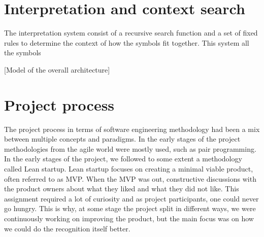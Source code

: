 

\section{Interpretation and context search} %



The interpretation system consist of a recursive search function and a set of fixed rules to determine the context of how the symbols fit together. This system all the symbols 

[Model of the overall architecture]





\section{Project process}
The project process in terms of software engineering methodology had been a mix between multiple concepts and paradigms. In the early stages of the project methodologies from the agile world were mostly used, such as pair programming. In the early stages of the project, we followed to some extent a methodology called Lean startup. Lean startup focuses on creating a minimal viable product, often referred to as \gls{MVP}. When the MVP was out, constructive discussions with the product owners about what they liked and what they did not like. This assignment required a lot of curiosity and as project participants, one could never go hungry. This is why, at some stage the project split in different ways, we were continuously working on improving the product, but the main focus was on how we could do the recognition itself better.


